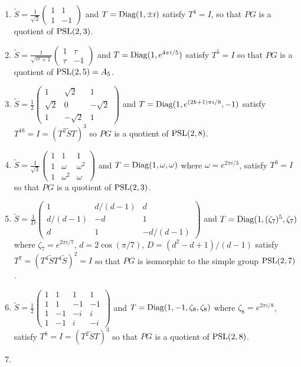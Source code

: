 \documentclass[12pt,psamsfonts]{amsart}
\newcommand{\tS}{\tilde{S}}
\numberwithin{equation}{section}
\theoremstyle{definition}
\begin{document}
\iffalse
\begin{enumerate}
\item $\tS=\frac{1}{\sqrt{2}}\begin{pmatrix} 1&1\\
1&-1\end{pmatrix}$ and $T=\operatorname{Diag}(1,\pm i)$ satisfy $T^4=I$, so that
$PG$ is a quotient of $\operatorname{PSL}(2,3)$. \item
$\tS=\frac{1}{\sqrt{\tau^2+1}}\begin{pmatrix}1&\tau\\ \tau
&-1\end{pmatrix}$ and $T=\operatorname{Diag}(1,e^{4\pi i/5})$ satisfy $T^5=I$ so
that $PG$ is a quotient of $\operatorname{PSL}(2,5)=A_5$. \item
$\tS=\frac{1}{2}\begin{pmatrix} 1 &\sqrt{2} &1\\\sqrt{2} &
0&-\sqrt{2}\\ 1&-\sqrt{2}&1\end{pmatrix}$ and
$T=\operatorname{Diag}(1,e^{(2k+1)\pi i/8},-1)$ satisfy $T^{16}=I=(T^2\tS T)^3$
so $PG$ is a quotient of $\operatorname{PSL}(2,8)$. \item
$\tS=\frac{1}{\sqrt{3}}\begin{pmatrix} 1 &1 &1\\ 1 &
\omega&\omega^2\\ 1&\omega^2&\omega\end{pmatrix}$ and
$T=\operatorname{Diag}(1,\omega,\omega)$ where $\omega=e^{2\pi i/3}$, satisfy
$T^3=I$ so that $PG$ is a quotient of $\operatorname{PSL}(2,3)$. \item
$\tS=\frac{1}{D}\begin{pmatrix} 1 &d/(d-1) &d\\d/(d-1) &
-d&1\\d&1&-d/(d-1)\end{pmatrix}$ and
$T=\operatorname{Diag}(1,(\zeta_7)^5,\zeta_7)$ where $\zeta_7=e^{2\pi i/7}$,
$d=2\cos(\pi/7)$, $D=(d^2-d+1)/(d-1)$ satisfy $T^7=(T^4\tS
T^4\tS)^2=I$ so that $PG$ is isomorphic to the simple group
$\operatorname{PSL}(2,7)$. \item
 $\tS=\frac{1}{2}\begin{pmatrix}
   1& 1& 1 & 1 \\
   1 & 1& -1 &-1\\
   1 & -1&-i &i\\
   1&-1&i& -i
 \end{pmatrix}$ and $T=\operatorname{Diag}(1,-1,\zeta_8,\zeta_8)$ where
 $\zeta_8=e^{2\pi i/8}$, satisfy $T^8=I=(T^2\tS T)^3$ so that $PG$ is a quotient of $\operatorname{PSL}(2,8)$.
\item

\end{enumerate}
\end{document}
